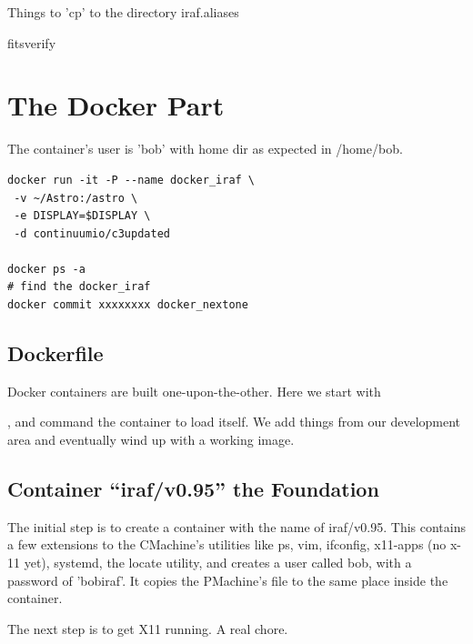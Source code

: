 \documentclass[letter,11pt,oneside]{article}
\newcommand{\dhl}[1]{{\color{verbcolor}{\texttt#1}}}
\begin{document}
Things to 'cp' to the directory
iraf.aliases

fitsverify


\section{The Docker Part}

The container's user is 'bob' with home dir as expected in
/home/bob.

\begin{tcolorbox}
  \begingroup \fontsize{10pt}{10pt}
\selectfont
\begin{verbatim} 
docker run -it -P --name docker_iraf \
 -v ~/Astro:/astro \
 -e DISPLAY=$DISPLAY \
 -d continuumio/c3updated

docker ps -a
# find the docker_iraf
docker commit xxxxxxxx docker_nextone

\end{verbatim}
\endgroup
\end{tcolorbox}


\subsection{Dockerfile} \label{sec:Dockerfile}

Docker containers are built one-upon-the-other. Here we start with

\dhl{continuumio/anaconda3}, and command the container to load itself.
We add things from our development area and eventually wind up with a working
image.


\subsection{Container ``iraf/v0.95'' the Foundation}

The initial step is to create a container with the name of iraf/v0.95. This
contains a few extensions to the CMachine's utilities like ps, vim, ifconfig,
x11-apps (no x-11 yet), systemd, the locate utility, and creates a
user called bob, with a password of 'bobiraf'. It copies the PMachine's
\dhl{/etc/default/keyboard} file to the same place inside the container.

The next step is to get X11 running. A real chore.


\end{document}
